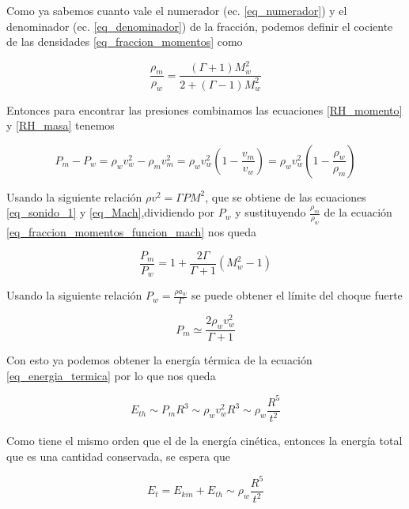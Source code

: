 \documentclass[12pt,a4paper]{book}
\begin{document}
Como ya sabemos cuanto vale el numerador (ec. \ref{eq_numerador}) y el denominador (ec. \ref{eq_denominador})
de la fracción, podemos definir el cociente de las densidades \ref{eq_fraccion_momentos} como 

\begin{equation}\label{eq_fraccion_momentos_funcion_mach}
  \frac{\rho_m}{\rho_w} = \frac{\left( \Gamma +1 \right) M_w^2}{2+ \left( \Gamma -1 \right) M_w^2}
\end{equation}

Entonces para encontrar las presiones combinamos las ecuaciones \ref{RH_momento} y \ref{RH_masa} tenemos

\begin{equation}
  P_m - P_w = \rho_w v_w^2 - \rho_m v_m^2 = \rho_w v_w^2 \left( 1 - \frac{v_m}{v_w}\right) = \rho_w v_w^2 \left( 1 - \frac{\rho_w}{\rho_m}\right)
\end{equation}

Usando la siguiente relación $\rho v^2 = \Gamma P M^2$, que se obtiene de las ecuaciones \ref{eq_sonido_1} y
\ref{eq_Mach},dividiendo por $P_w$ y sustituyendo  $\frac{\rho_m}{\rho_w}$ de la ecuación 
\ref{eq_fraccion_momentos_funcion_mach}
nos queda

\begin{equation} \label{eq_fraccion_Presiones}
  \frac{P_m}{P_w} = 1 + \frac{2 \Gamma}{\Gamma + 1} \left( M_w^2 -1\right)
\end{equation}

Usando la siguiente relación $ P_w = \frac{\rho a_w }{\Gamma}$ se puede obtener el límite del choque fuerte

\begin{equation}
  P_m  \simeq \frac{2 \rho_w v_w^2}{\Gamma + 1}
\end{equation}

Con esto ya podemos obtener la energía térmica de la ecuación \ref{eq_energia_termica} por lo que nos queda 

\begin{equation}
  E_{th} \sim P_m R^3 \sim \rho_w v_w^2 R^3 \sim \rho_w \frac{R^5}{t^2}
\end{equation}

Como tiene el mismo orden que el de la energía cinética, entonces la energía total que es una cantidad conservada, se espera que

\begin{equation}
  E_t = E_{kin} + E_{th} \sim \rho_w \frac{R^5}{t^2}
\end{equation}
\end{document}
